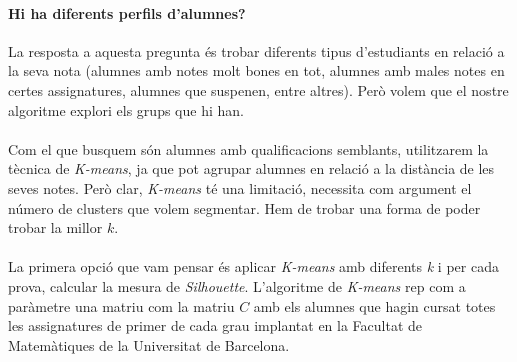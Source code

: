 \documentclass[12pt,a4paper,catalan]{article}
\begin{document}
\newpage

\paragraph{Hi ha diferents perfils d'alumnes?}
La resposta a aquesta pregunta és trobar diferents tipus d'estudiants en relació a la seva nota (alumnes amb notes molt bones en tot, alumnes amb males notes en certes assignatures, alumnes que suspenen, entre altres). Però volem que el nostre algoritme explori els grups que hi han.
\\
\\
Com el que busquem són alumnes amb qualificacions semblants, utilitzarem la tècnica de \textit{K-means}, ja que pot agrupar alumnes en relació a la distància de les seves notes. Però clar, \textit{K-means} té una limitació, necessita com argument el número de clusters que volem segmentar. Hem de trobar una forma de poder trobar la millor $k$.
\\
\\
La primera opció que vam pensar és aplicar \textit{K-means} amb diferents \textit{k} i per cada prova, calcular la mesura de \textit{Silhouette}. L'algoritme de \textit{K-means} rep com a paràmetre una matriu com la matriu $C$ amb els alumnes que hagin cursat totes les assignatures de primer de cada grau implantat en la Facultat de Matemàtiques de la Universitat de Barcelona. 
\end{document}
